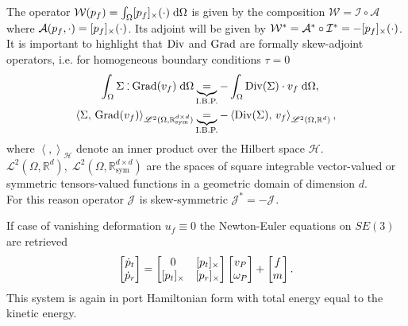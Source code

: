 The operator $\mathcal{W}(p_f) = \int_\Omega \crmat{p_f}(\cdot) \d{\Omega}$ is given by the composition $\mathcal{W} = \mathcal{I} \circ \mathcal{A}$ where $\mathcal{A}(p_f, \cdot) = [p_f]_{\times}(\cdot)$. Its adjoint will be given by $\mathcal{W}^* = \mathcal{A}^* \circ \mathcal{I}^*= - [p_f]_{\times}(\cdot)$.\\
It is important to highlight that $\operatorname*{Div}$ and $\operatorname*{Grad}$ are formally skew-adjoint operators, i.e. for homogeneous boundary conditions $\tau= 0$
\begin{align*}
\int_{\Omega} \Sigma \cddot \Grad(v_f) \d{\Omega} &\underbrace{=}_{\text{I.B.P.}} -\int_{\Omega} \Div(\Sigma) \cdot v_f \d{\Omega}, \\
\left\langle \Sigma, \, \Grad(v_f) \right\rangle_{\mathscr{L}^2(\Omega, \mathbb{R}^{d\times d}_{\text{sym}})} &\underbrace{=}_{\text{I.B.P.}} -\left\langle\Div(\Sigma), \, v_f \right\rangle_{\mathscr{L}^2(\Omega, \mathbb{R}^d)}, 
\end{align*}
where $\left\langle ,  \right\rangle_\mathscr{H}$ denote an inner product over the Hilbert space $\mathscr{H}$. \\
$\mathscr{L}^2(\Omega, \mathbb{R}^d), \; \mathscr{L}^2(\Omega, \mathbb{R}^{d\times d}_{\text{sym}})$ are the spaces of square integrable vector-valued or symmetric tensors-valued functions in a geometric domain of dimension $d$. \\
For this reason operator $\mathcal{J}_{}$ is skew-symmetric $\mathcal{J}_{}^* = - \mathcal{J}_{}$.

\begin{remark}
If case of vanishing deformation $u_f \equiv 0$ the Newton-Euler equations on $SE(3)$ are retrieved
\begin{equation}
\begin{bmatrix}
\dot{p}_t \\ \dot{p}_r \\
\end{bmatrix} = 
\begin{bmatrix}
	0 & \crmat{p_t}\\
	\crmat{p_t} & \crmat{p_r} \\
	\end{bmatrix}
\begin{bmatrix}
v_P \\ \omega_P  \\
\end{bmatrix} + 
\begin{bmatrix}
f \\ m \\
\end{bmatrix}.
\end{equation}
This system is again in port Hamiltonian form with total energy equal to the kinetic energy.
\end{remark}
